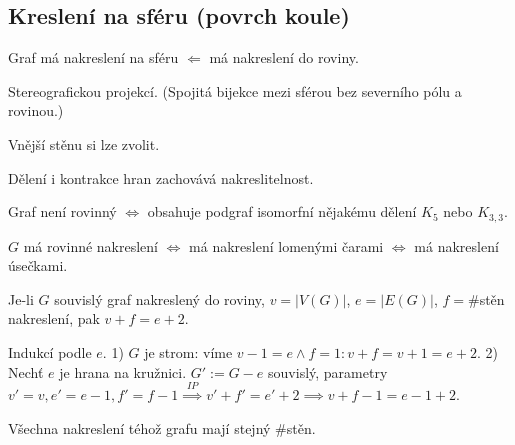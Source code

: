 \documentclass[12pt]{article}					%
\begin{document}
    \subsection{Kreslení na sféru (povrch koule)}
        \begin{veta}
            Graf má nakreslení na sféru $\Leftarrow$ má nakreslení do roviny.
            \begin{dukazin}
                Stereografickou projekcí. (Spojitá bijekce mezi sférou bez severního pólu a rovinou.)
            \end{dukazin}
        \end{veta}

        \begin{dusledek}
            Vnější stěnu si lze zvolit.
        \end{dusledek}

        \begin{poznamka}
            Dělení i kontrakce hran zachovává nakreslitelnost.
        \end{poznamka}

        \begin{veta}[Kuratowského]
            Graf není rovinný $\Leftrightarrow$ obsahuje podgraf isomorfní nějakému dělení $K_5$ nebo $K_{3, 3}$.
        \end{veta}

        \begin{dusledek}
            $G$ má rovinné nakreslení $\Leftrightarrow$ má nakreslení lomenými čarami $\Leftrightarrow$ má nakreslení úsečkami.
        \end{dusledek}

        \begin{veta}
            Je-li $G$ souvislý graf nakreslený do roviny, $v = |V(G)|$, $e = |E(G)|$, $f=\#$stěn nakreslení, pak $v+f = e+2$.
            \begin{dukazin}
                Indukcí podle $e$. 1) $G$ je strom: víme $v-1=e \land f=1: v+f=v+1 =e+2$. 2) Nechť $e$ je hrana na kružnici. $G' := G-e$ souvislý, parametry $v'=v, e'=e-1, f'=f-1 \overset{IP}{\implies} v'+f'=e'+2 \implies v+f-1 = e-1+2$.
            \end{dukazin}
        \end{veta}

        \begin{dusledek}
            Všechna nakreslení téhož grafu mají stejný \#stěn.
        \end{dusledek}
\end{document}
